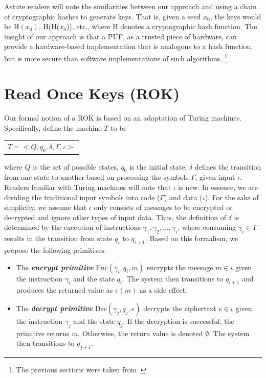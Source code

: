 Astute readers will note the similarities between our approach and using a chain of cryptographic hashes to generate
keys.  That is, given a seed $x_0$, the keys would be {\sf H}$(x_0)$, {\sf H}({\sf H}($x_0$)), etc., where {\sf H}
denotes a cryptographic hash function.  The insight of our approach is that a PUF, as a trusted piece of hardware,
can provide a hardware-based implementation that is analogous to a hash function, but is more secure than
software implementations of such algorithms.
\footnote{The previous sections were taken from~\cite{PUFROK}}

\section{Read Once Keys (ROK)}
Our formal notion of a ROK is based on an adaptation of Turing machines.  Specifically, define the machine $T$ to be
\begin{center}
\begin{tabular}{c}
$T = < Q,q_0,\delta,\Gamma,\iota >$
\end{tabular}
\end{center}
where $Q$ is the set of possible states, $q_0$ is the initial state, $\delta$ defines the transition
from one state to another based on processing the symbols $\Gamma$, given input $\iota$.  Readers familiar with Turing
machines will note that $\iota$ is new.  In essence, we are dividing the traditional input symbols into code ($\Gamma$)
and data ($\iota$).  For the sake of simplicity, we assume that $\iota$ only consists of messages to be encrypted or
decrypted and ignore other types of input data.  Thus, the definition of $\delta$ is determined by the execution of
instructions $\gamma_1, \gamma_2, \ldots, \gamma_i$, where consuming $\gamma_i \in \Gamma$ results in the transition from state $q_i$ to
$q_{i+1}$.  Based on this formalism, we propose the following primitives.

\begin{itemize}
\item The \emph{\bf encrypt primitive} {\sf Enc}$(\gamma_i,q_i,m)$ encrypts the message $m \in \iota$ given the instruction
$\gamma_i$ and the state $q_i$.  The system then transitions to $q_{i+1}$ and produces the returned value as $e(m)$ as a side effect.
\item The \emph{\bf decrypt primitive} {\sf Dec}$(\gamma_j,q_j,e)$ decrypts the ciphertext $e \in \iota$ given the instruction
$\gamma_j$ and the state $q_j$.  If the decryption is successful, the primitive returns $m$.  Otherwise, the return value is 
denoted $\emptyset$.  The system then transitions to $q_{j+1}$.
\end{itemize}

